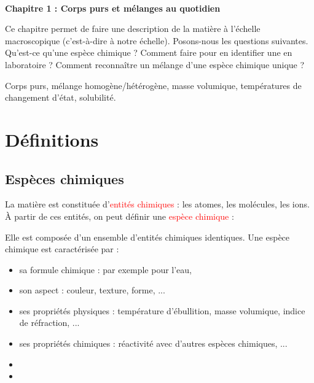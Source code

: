 \newpage
$ $
\newpage

\renewcommand{\thesubsection}{\textcolor{red}{\Roman{section}.\arabic{subsection}}}
\renewcommand{\thesubsubsection}{\textcolor{red}{\Roman{section}.\arabic{subsection}.\alph{subsubsection}}}

\setcounter{section}{0}
\sndEnTeteDeux

\begin{center}
\begin{mdframed}[style=titr, leftmargin=60pt, rightmargin=60pt, innertopmargin=7pt, innerbottommargin=7pt, innerrightmargin=8pt, innerleftmargin=8pt]

\begin{center}
\large{\textbf{Chapitre 1 : Corps purs et mélanges au quotidien}}
\end{center}

\end{mdframed}
\end{center}
Ce chapitre permet de faire une description de la matière à l'échelle macroscopique (c'est-à-dire à notre échelle). Posons-nous les questions suivantes. Qu'est-ce qu'une espèce chimique ? Comment faire pour en identifier une en laboratoire ? Comment reconnaître un mélange d'une espèce chimique unique ?
%
\begin{tcolorbox}[colback=blue!5!white,colframe=blue!75!black,title=Mots clés du chapitre :]
Corps purs, mélange homogène/hétérogène, masse volumique, températures de changement d'état, solubilité.
\end{tcolorbox}

%

\section{Définitions}

\subsection{Espèces chimiques}

La matière est constituée d'\textcolor{red}{entités chimiques} : les atomes, les molécules, les ions. \`{A} partir de ces entités, on peut définir une \textcolor{red}{espèce chimique} :
\begin{tcolorbox}[colback=green!5!white,colframe=green!75!black,title=\textbf{Espèce chimique}, upperbox=invisible]
Elle est composée d'un ensemble d'entités chimiques identiques. Une espèce chimique est caractérisée par :
\begin{itemize}
    \item sa formule chimique : par exemple  pour l'eau,
    \item son aspect : couleur, texture, forme, ...
    \item ses propriétés physiques : température d'ébullition, masse volumique, indice de réfraction, ...
    \item ses propriétés chimiques : réactivité avec d'autres espèces chimiques, ... 
    \item 
    \item
\end{itemize}

\end{tcolorbox}

